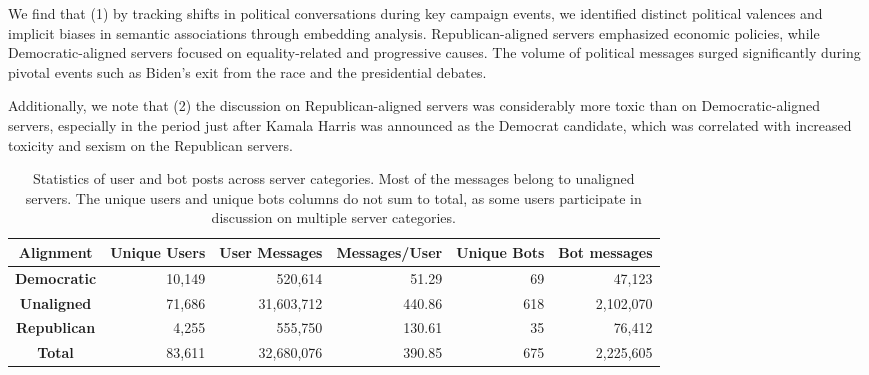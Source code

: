 We find that (1) by tracking shifts in political conversations during key campaign events, we identified distinct political valences and implicit biases in semantic associations through embedding analysis. Republican-aligned servers emphasized economic policies, while Democratic-aligned servers focused on equality-related and progressive causes. The volume of political messages surged significantly during pivotal events such as Biden's exit from the race and the presidential debates.


Additionally, we note that (2) the discussion on Republican-aligned servers was considerably more toxic than on Democratic-aligned servers, especially in the period just after Kamala Harris was announced as the Democrat candidate, which was correlated with increased toxicity and sexism on the Republican servers.

\begin{table*}[!h]
\small
\centering
\caption{Statistics of user and bot posts across server categories. Most of the messages belong to unaligned servers. The unique users and unique bots columns do not sum to total, as some users participate in discussion on multiple server categories.}
\begin{tabular}{crrrrr} \toprule
\textbf{Alignment} & \textbf{Unique Users} & \textbf{User Messages} & \textbf{Messages/User} & \textbf{Unique Bots} & \textbf{Bot messages} \\ \midrule
\textbf{ Democratic}    & 10,149                & 520,614                & 51.29                  & 69                   & 47,123                \\
\textbf{Unaligned} & 71,686                & 31,603,712             & 440.86                 & 618                  & 2,102,070             \\
\textbf{ Republican}   & 4,255                 & 555,750                & 130.61                 & 35                   & 76,412                \\
\textbf{Total}   & 83,611                & 32,680,076             & 390.85                 & 675                  & 2,225,605             \\ \bottomrule
\end{tabular}

\label{tab:statistics}
\end{table*}
